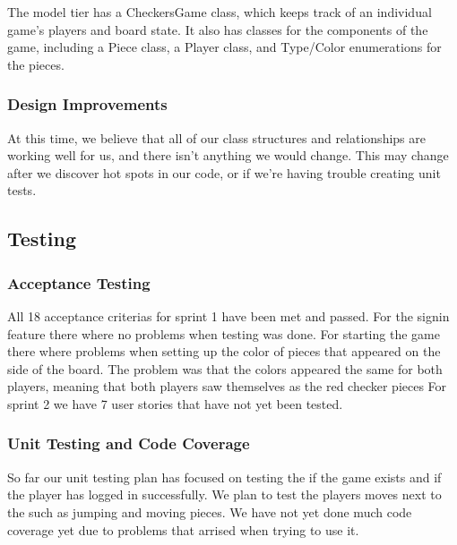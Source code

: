 \documentclass[]{article}
\begin{document}
The model tier has a CheckersGame class, which keeps track of an
individual game's players and board state. It also has classes for the
components of the game, including a Piece class, a Player class, and
Type/Color enumerations for the pieces.

\hypertarget{design-improvements}{%
\subsubsection{Design Improvements}\label{design-improvements}}

At this time, we believe that all of our class structures and
relationships are working well for us, and there isn't anything we would
change. This may change after we discover hot spots in our code, or if
we're having trouble creating unit tests.

\hypertarget{testing}{%
\subsection{Testing}\label{testing}}

\hypertarget{acceptance-testing}{%
\subsubsection{Acceptance Testing}\label{acceptance-testing}}

All 18 acceptance criterias for sprint 1 have been met and passed. For
the signin feature there where no problems when testing was done. For
starting the game there where problems when setting up the color of
pieces that appeared on the side of the board. The problem was that the
colors appeared the same for both players, meaning that both players saw
themselves as the red checker pieces For sprint 2 we have 7 user stories
that have not yet been tested.

\hypertarget{unit-testing-and-code-coverage}{%
\subsubsection{Unit Testing and Code
Coverage}\label{unit-testing-and-code-coverage}}

So far our unit testing plan has focused on testing the if the game
exists and if the player has logged in successfully. We plan to test the
players moves next to the such as jumping and moving pieces. We have not
yet done much code coverage yet due to problems that arrised when trying
to use it.
\end{document}
